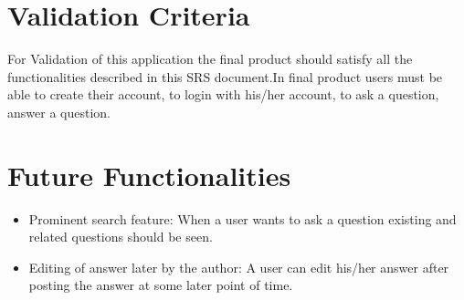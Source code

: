 \documentclass[journal,12pt,onecolumn,draftclsnofoot,]{IEEEtran}
\begin{document}
\section{Validation Criteria}
For Validation of this application the final product should satisfy all the functionalities described in this SRS document.In final product users must be able to create their account, to login with his/her account, to ask a question, answer a question.

\section{Future Functionalities}
\begin{itemize}
\item Prominent search feature: When a user wants to ask a question existing and related questions should be seen.
\item Editing of answer later by the author: A user can edit his/her answer after posting the answer at some later point of time.
\end{itemize}
\end{document}

